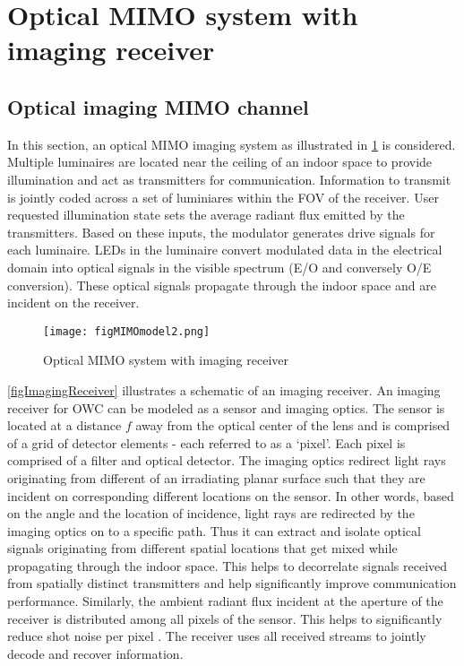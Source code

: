 \section{Optical MIMO system with imaging receiver}
\label{sec:mimoImaging}

\subsection{Optical imaging MIMO channel}
\label{subsec:mimoImagingChannel}

\graphicspath{{_MIMOSpace/figures_mimoImg/}}
In this section, an optical MIMO imaging system as illustrated in \figurename{ \ref{figMIMOblock}} is considered. Multiple luminaires are located near the ceiling of an indoor space to provide illumination and act as transmitters for communication. Information to transmit is jointly coded across a set of luminiares within the FOV of the receiver. User requested illumination state sets the average radiant flux emitted by the transmitters. Based on these inputs, the modulator generates drive signals for each luminaire. LEDs in the luminaire convert modulated data in the electrical domain into optical signals in the visible spectrum (E/O and conversely O/E conversion). These optical signals propagate through the indoor space and are incident on the receiver. 

\begin{figure}[!t]
	\centering
		\texttt{[image: figMIMOmodel2.png]}
	\caption{Optical MIMO system with imaging receiver}
	\label{figMIMOblock}
\end{figure}

\figurename{ \ref{figImagingReceiver}} illustrates a schematic of an imaging receiver. An imaging receiver for OWC can be modeled as a sensor and imaging optics. The sensor is located at a distance $f$ away from the optical center of the lens and is comprised of a grid of detector elements - each referred to as a `pixel'. Each pixel is comprised of a filter and optical detector. The imaging optics redirect light rays originating from different of an irradiating planar surface such that they are incident on corresponding different locations on the sensor. In other words, based on the angle and the location of incidence, light rays are redirected by the imaging optics on to a specific path. Thus it can extract and isolate optical signals originating from different spatial locations that get mixed while propagating through the indoor space. This helps to decorrelate signals received from spatially distinct transmitters and help significantly improve communication performance. Similarly, the ambient radiant flux incident at the aperture of the receiver is distributed among all pixels of the sensor. This helps to significantly reduce shot noise per pixel \cite{dja00a}. The receiver uses all received streams to jointly decode and recover information. 

